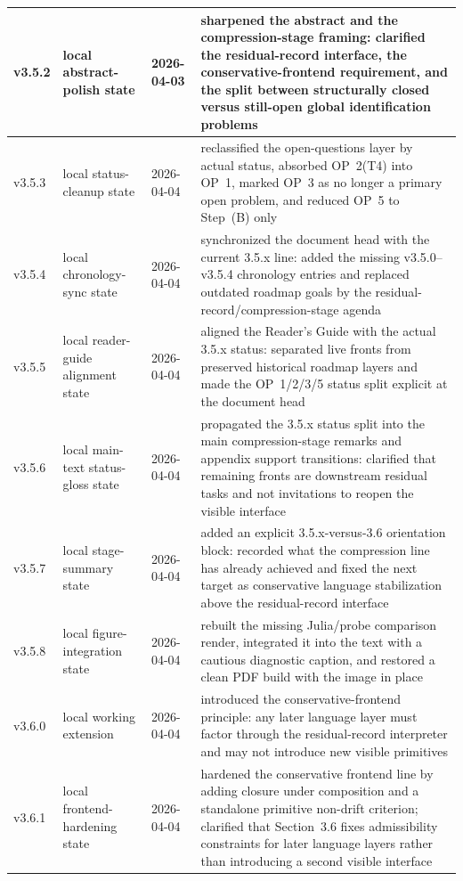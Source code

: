 {\begin{longtable}{|p{}|p{}|p{}|p{}|}
\hline
v3.5.2 & local abstract-polish state & 2026-04-03 & sharpened the abstract and the compression-stage framing: clarified the residual-record interface, the conservative-frontend requirement, and the split between structurally closed versus still-open global identification problems \\
\hline
v3.5.3 & local status-cleanup state & 2026-04-04 & reclassified the open-questions layer by actual status, absorbed OP~2(T4) into OP~1, marked OP~3 as no longer a primary open problem, and reduced OP~5 to Step~(B) only \\
\hline
v3.5.4 & local chronology-sync state & 2026-04-04 & synchronized the document head with the current 3.5.x line: added the missing v3.5.0--v3.5.4 chronology entries and replaced outdated roadmap goals by the residual-record/compression-stage agenda \\
\hline
v3.5.5 & local reader-guide alignment state & 2026-04-04 & aligned the Reader's Guide with the actual 3.5.x status: separated live fronts from preserved historical roadmap layers and made the OP~1/2/3/5 status split explicit at the document head \\
\hline
v3.5.6 & local main-text status-gloss state & 2026-04-04 & propagated the 3.5.x status split into the main compression-stage remarks and appendix support transitions: clarified that remaining fronts are downstream residual tasks and not invitations to reopen the visible interface \\
\hline
v3.5.7 & local stage-summary state & 2026-04-04 & added an explicit 3.5.x-versus-3.6 orientation block: recorded what the compression line has already achieved and fixed the next target as conservative language stabilization above the residual-record interface \\
\hline
v3.5.8 & local figure-integration state & 2026-04-04 & rebuilt the missing Julia/probe comparison render, integrated it into the text with a cautious diagnostic caption, and restored a clean PDF build with the image in place \\
\hline
v3.6.0 & local working extension & 2026-04-04 & introduced the conservative-frontend principle: any later language layer must factor through the residual-record interpreter and may not introduce new visible primitives \\
\hline
v3.6.1 & local frontend-hardening state & 2026-04-04 & hardened the conservative frontend line by adding closure under composition and a standalone primitive non-drift criterion; clarified that Section~3.6 fixes admissibility constraints for later language layers rather than introducing a second visible interface \\

\end{longtable}}
